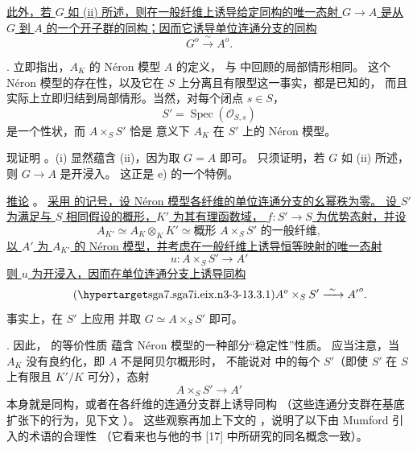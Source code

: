 \smallskip
\noindent
\underline{此外，若 $G$ 如 (ii) 所述，则在一般纤维上诱导给定同构的唯一态射
$G\longrightarrow A$ 是从 $G$ 到 $A$ 的一个开子群的同构；因而它诱导单位连通分支的同构}
\[
 G^o\xrightarrow{\ \sim\ }A^o.
\]

\medskip
\noindent
{}. 立即指出，$A_K$ 的 N\'eron 模型 $A$ 的定义，
与  中回顾的局部情形相同。
这个 N\'eron 模型的存在性，以及它在 $S$ 上分离且有限型这一事实，都是已知的，
而且实际上立即归结到局部情形。当然，对每个闭点 $s\in S$，
\[
 S'=\operatorname{Spec}(\mathcal O_{S,s})
\]
是一个性状，而 $A\times_S S'$ 恰是  意义下 $A_K$ 在 $S'$ 上的 N\'eron 模型。

现证明 。(i) 显然蕴含 (ii)，因为取 $G=A$ 即可。
只须证明，若 $G$ 如 (ii) 所述，则 $G\longrightarrow A$ 是开浸入。
这正是  e) 的一个特例。

\medskip
\noindent
\underline{推论} 。
\underline{采用  的记号，设 N\'eron 模型各纤维的单位连通分支的幺幂秩为零。
设 $S'$ 为满足与 $S$ 相同假设的概形，$K'$ 为其有理函数域，
$f:S'\longrightarrow S$ 为优势态射，并设}
\[
 A_{K'}\simeq A_K\otimes_KK'
 \simeq \text{概形 }A\times_SS'\text{ 的一般纤维},
\]
\underline{以 $A'$ 为 $A_{K'}$ 的 N\'eron 模型，并考虑在一般纤维上诱导恒等映射的唯一态射}
\[
 u:A\times_SS'\longrightarrow A'
\]
\underline{则 $u$ 为开浸入，因而在单位连通分支上诱导同构}
\begin{equation}\tag{\SGARefTarget{sga7.sga7i.eix.n3-3-1}{3.3.1}}
 A^o\times_SS'\xrightarrow{\ \sim\ }{A'}^o.
\end{equation}
事实上，在 $S'$ 上应用  并取 $G\simeq A\times_SS'$ 即可。

\medskip
\noindent
{}. 因此， 的等价性质
蕴含 N\'eron 模型的一种部分“稳定性”性质。
应当注意，当 $A_K$ 没有良约化，即 $A$ 不是阿贝尔概形时，
不能说对  中的每个 $S'$（即使 $S'$ 在 $S$ 上有限且 $K'/K$ 可分），态射
\[
 A\times_SS'\longrightarrow A'
\]
本身就是同构，或者在各纤维的连通分支群上诱导同构
（这些连通分支群在基底扩张下的行为，见下文 ）。
这些观察再加上下文的 ，说明了以下由 Mumford 引入的术语的合理性
（它看来也与他的书 [17] 中所研究的同名概念一致）。

